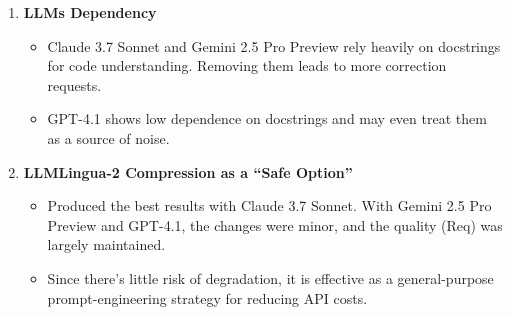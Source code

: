 \begin{enumerate}
    \item \textbf{LLMs Dependency}
        \begin{itemize}[label={$\bullet$}]
            \item Claude 3.7 Sonnet and Gemini 2.5 Pro Preview rely heavily on docstrings for code understanding. Removing them leads to more correction requests.
            \vspace{0.2cm}
            
            \item GPT-4.1 shows low dependence on docstrings and may even treat them as a source of noise.
        \end{itemize}
\vspace{0.3cm}

    \item \textbf{LLMLingua-2 Compression as a “Safe Option”}
        \begin{itemize}[label={$\bullet$}]
            \item Produced the best results with Claude 3.7 Sonnet. With Gemini 2.5 Pro Preview and GPT-4.1, the changes were minor, and the quality (Req) was largely maintained.
            \vspace{0.2cm}
            
            \item Since there’s little risk of degradation, it is effective as a general-purpose prompt-engineering strategy for reducing API costs.
        \end{itemize}
\end{enumerate}

